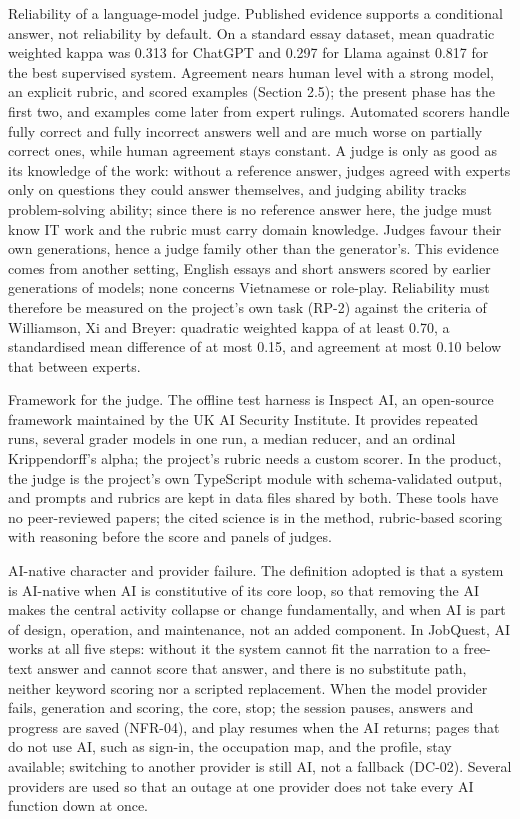 Reliability of a language-model judge. Published evidence supports a conditional answer, not reliability by default. On a standard essay dataset, mean quadratic weighted kappa was 0.313 for ChatGPT and 0.297 for Llama against 0.817 for the best supervised system\cite{r127}. Agreement nears human level with a strong model, an explicit rubric, and scored examples (Section 2.5)\cite{r101,r102,r103,r104,r105}; the present phase has the first two, and examples come later from expert rulings. Automated scorers handle fully correct and fully incorrect answers well and are much worse on partially correct ones, while human agreement stays constant\cite{r128}. A judge is only as good as its knowledge of the work: without a reference answer, judges agreed with experts only on questions they could answer themselves\cite{r129}, and judging ability tracks problem-solving ability\cite{r60}; since there is no reference answer here, the judge must know IT work and the rubric must carry domain knowledge. Judges favour their own generations\cite{r130}, hence a judge family other than the generator's. This evidence comes from another setting, English essays and short answers scored by earlier generations of models; none concerns Vietnamese or role-play. Reliability must therefore be measured on the project's own task (RP-2) against the criteria of Williamson, Xi and Breyer\cite{r71}: quadratic weighted kappa of at least 0.70, a standardised mean difference of at most 0.15, and agreement at most 0.10 below that between experts.

Framework for the judge. The offline test harness is Inspect AI, an open-source framework maintained by the UK AI Security Institute\cite{r131}. It provides repeated runs, several grader models in one run, a median reducer, and an ordinal Krippendorff's alpha; the project's rubric needs a custom scorer. In the product, the judge is the project's own TypeScript module with schema-validated output, and prompts and rubrics are kept in data files shared by both. These tools have no peer-reviewed papers; the cited science is in the method, rubric-based scoring with reasoning before the score\cite{r58} and panels of judges\cite{r74}.

AI-native character and provider failure. The definition adopted is that a system is AI-native when AI is constitutive of its core loop, so that removing the AI makes the central activity collapse or change fundamentally\cite{r132}, and when AI is part of design, operation, and maintenance, not an added component\cite{r133}. In JobQuest, AI works at all five steps: without it the system cannot fit the narration to a free-text answer and cannot score that answer, and there is no substitute path, neither keyword scoring nor a scripted replacement. When the model provider fails, generation and scoring, the core, stop; the session pauses, answers and progress are saved (NFR-04), and play resumes when the AI returns; pages that do not use AI, such as sign-in, the occupation map, and the profile, stay available; switching to another provider is still AI, not a fallback (DC-02). Several providers are used so that an outage at one provider does not take every AI function down at once.

